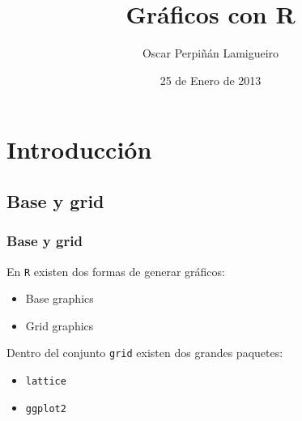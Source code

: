 \documentclass[xcolor={usenames,svgnames,dvipsnames}]{beamer}
\title{Gráficos con R}
\author{Oscar Perpiñán Lamigueiro}
\date{25 de Enero de 2013}
\begin{document}
\maketitle




\section{Introducción}
\label{sec-1}
\subsection{Base y grid}
\label{sec-1-1}
\begin{frame}
\frametitle{Base y grid}
\label{sec-1-1-1}

 En \texttt{R} existen dos formas de generar gráficos:
\begin{itemize}
\item Base graphics
\item Grid graphics
\end{itemize}

Dentro del conjunto \texttt{grid} existen dos grandes paquetes:
\begin{itemize}
\item \texttt{lattice}
\item \texttt{ggplot2}
\end{itemize}
\end{frame}
\end{document}
